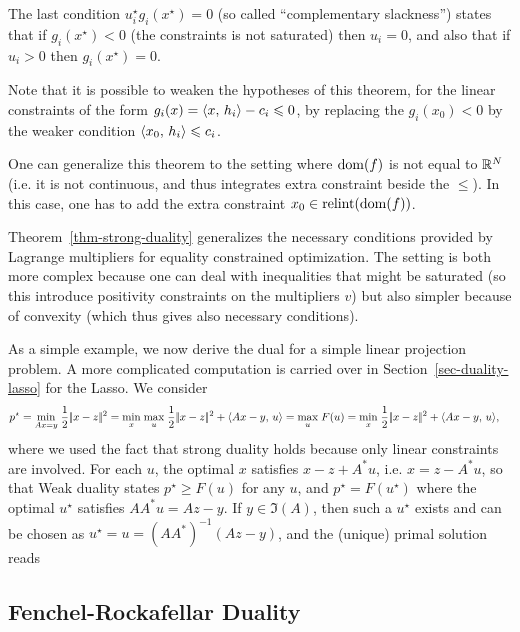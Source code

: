 The last condition $u_i^\star g_i(x^\star) = 0$ (so called ``complementary slackness'') states that if $g_i(x^\star)<0$ (the constraints is not saturated) then $u_i=0$, and also that if $u_i>0$ then $g_i(x^\star)=0$.

Note that it is possible to weaken the hypotheses of this theorem, for the linear constraints of the form $g_i(x) = \langle x,\,h_i\rangle - c_i \leqslant 0$, by replacing the $g_i(x_0)<0$ by the weaker condition $\langle x_0,\,h_i\rangle \leqslant c_i$.

One can generalize this theorem to the setting where $\operatorname{dom}(f)$ is not equal to $\mathbb{R}^N$ (i.e. it is not continuous, and thus integrates extra constraint beside the $\leq$). In this case, one has to add the extra constraint $x_0 \in \operatorname{relint}(\operatorname{dom}(f))$.
	
Theorem~\ref{thm-strong-duality} generalizes the necessary conditions provided by Lagrange multipliers for equality constrained optimization. The setting is both more complex because one can deal with inequalities that might be saturated (so this introduce positivity constraints on the multipliers $v$) but also simpler because of convexity (which thus gives also necessary conditions).

As a simple example, we now derive the dual for a simple linear projection problem. A more complicated computation is carried over in Section~\ref{sec-duality-lasso} for the Lasso. We consider
\begin{align*}
	p^\star = \underset{Ax=y}{\min}\; \frac{1}{2}|\!| x-z |\!|^2 &= \underset{x}{\min}\; \underset{u}{\max}\; \frac{1}{2}|\!| x-z |\!|^2 + \langle Ax-y,\,u\rangle
	= \underset{u}{\max}\; F(u) = \underset{x}{\min}\; \frac{1}{2}|\!| x-z |\!|^2 + \langle Ax-y,\,u\rangle, 
\end{align*}
where we used the fact that strong duality holds because only linear constraints are involved.
%
For each $u$, the optimal $x$ satisfies $x-z+A^*u$, i.e. $x=z-A^*u$, so that 
Weak duality states $p^\star \geq F(u)$ for any $u$, and $p^\star = F(u^\star)$ where the optimal $u^\star$ satisfies $AA^*u = Az-y$. If $y \in \Im(A)$, then such a $u^\star$ exists and can be chosen as $u^\star = u=(AA^*)^{-1} (Az -y)$, and the (unique) primal solution reads 



\subsection{Fenchel-Rockafellar Duality}

